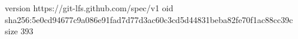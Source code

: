 version https://git-lfs.github.com/spec/v1
oid sha256:5e0cd94677c9a086e91fad7d77d3ac60c3cd5d44831beba82fe70f1ac88cc39c
size 393
